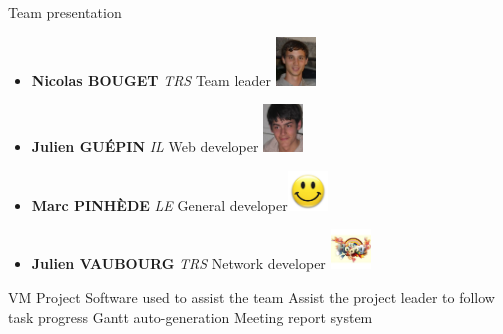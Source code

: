 \documentclass[12pt]{beamer}
\begin{document}
\begin{frame}{Team presentation}
    \begin{itemize}
	\item {\bf Nicolas BOUGET} \emph{TRS} Team leader \hfill \includegraphics[width=30pt]{img/bouget.jpg}\\
	\vfill
	\item {\bf Julien GUÉPIN} \emph{IL} Web developer \hfill \includegraphics[width=30pt]{img/guepin.jpg}
	\vfill
	\item {\bf Marc PINHÈDE} \emph{LE} General developer\hfill \includegraphics[width=30pt]{img/pinhede.jpg}
	\vfill
	\item {\bf Julien VAUBOURG} \emph{TRS} Network developer \hfill \includegraphics[width=30pt]{img/vaubourg.jpg}
    \end{itemize}
\end{frame}


\begin{frame}{VM Project}
    Software used to assist the team
    \vfill
    Assist the project leader to follow task progress
    \vfill
    Gantt auto-generation
    \vfill
    Meeting report system
\end{frame}
\end{document}
